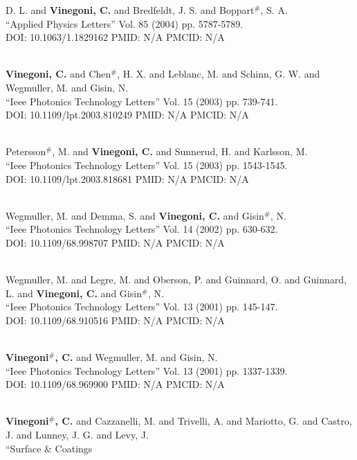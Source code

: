 D. L. and {\bf Vinegoni, C.} and Bredfeldt, J. S. and Boppart$^\#$, S. A. \\ ``Applied Physics Letters'' Vol. 85 (2004) pp. 5787-5789. \\ DOI: 10.1063/1.1829162 PMID: N/A PMCID: N/A\item {} \\ {\bf Vinegoni, C.} and Chen$^\#$, H. X. and Leblanc, M. and Schinn, G. W. and Wegmuller, M. and Gisin, N. \\ ``Ieee Photonics Technology Letters'' Vol. 15 (2003) pp. 739-741. \\ DOI: 10.1109/lpt.2003.810249 PMID: N/A PMCID: N/A\item {} \\ Petersson$^\#$, M. and {\bf Vinegoni, C.} and Sunnerud, H. and Karlsson, M. \\ ``Ieee Photonics Technology Letters'' Vol. 15 (2003) pp. 1543-1545. \\ DOI: 10.1109/lpt.2003.818681 PMID: N/A PMCID: N/A\item {} \\ Wegmuller, M. and Demma, S. and {\bf Vinegoni, C.} and Gisin$^\#$, N. \\ ``Ieee Photonics Technology Letters'' Vol. 14 (2002) pp. 630-632. \\ DOI: 10.1109/68.998707 PMID: N/A PMCID: N/A\item {} \\ Wegmuller, M. and Legre, M. and Oberson, P. and Guinnard, O. and Guinnard, L. and {\bf Vinegoni, C.} and Gisin$^\#$, N. \\ ``Ieee Photonics Technology Letters'' Vol. 13 (2001) pp. 145-147. \\ DOI: 10.1109/68.910516 PMID: N/A PMCID: N/A\item {} \\ {\bf Vinegoni$^\#$, C.} and Wegmuller, M. and Gisin, N. \\ ``Ieee Photonics Technology Letters'' Vol. 13 (2001) pp. 1337-1339. \\ DOI: 10.1109/68.969900 PMID: N/A PMCID: N/A\item {} \\ {\bf Vinegoni$^\#$, C.} and Cazzanelli, M. and Trivelli, A. and Mariotto, G. and Castro, J. and Lunney, J. G. and Levy, J. \\ ``Surface & Coatings 